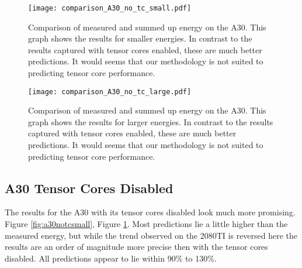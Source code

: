 \documentclass[conference]{IEEEtran}
\begin{document}


\begin{figure}
    \texttt{[image: comparison\_A30\_no\_tc\_small.pdf]}
    \caption{Comparison of measured and summed up energy on the A30. This graph shows the results for smaller energies. In contrast to the results captured with tensor cores enabled, these are much better predictions. It would seems that our methodology is not suited to predicting tensor core performance.}
    \label{fig:a30notcsmall}
    \texttt{[image: comparison\_A30\_no\_tc\_large.pdf]}
    \caption{Comparison of measured and summed up energy on the A30. This graph shows the results for larger energies. In contrast to the results captured with tensor cores enabled, these are much better predictions. It would seems that our methodology is not suited to predicting tensor core performance.}
    \label{fig:a30notclarge}
\end{figure}

\subsection{A30 Tensor Cores Disabled}
The results for the A30 with its tensor cores disabled look much more promising. Figure \ref{fig:a30notcsmall}, Figure \ref{fig:a30notclarge}. Most predictions lie a little higher than the measured energy, but while the trend observed on the 2080TI is reversed here the results are an order of magnitude more precise then with the tensor cores disabled. All predictions appear to lie within 90\% to 130\%.
\end{document}
